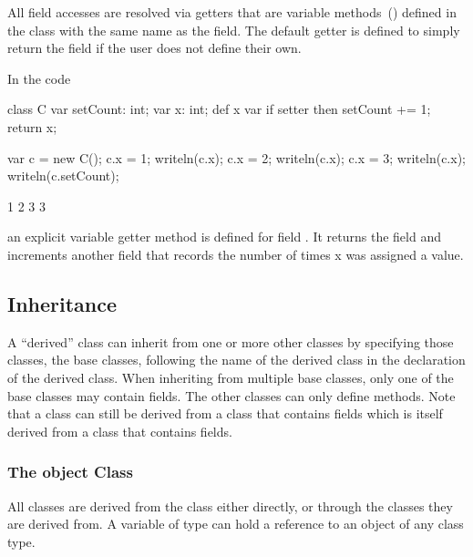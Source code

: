 All field accesses are resolved via getters that are variable
methods~() defined in the class with the same
name as the field.  The default getter is defined to simply return the
field if the user does not define their own.

\begin{example}
In the code
\begin{chapelpre}
\end{chapelpre}
\begin{chapel}
class C {
  var setCount: int;
  var x: int;
  def x var {
    if setter then
      setCount += 1;
    return x;
  }
}
\end{chapel}
\begin{chapelpost}
var c = new C();
c.x = 1;
writeln(c.x);
c.x = 2;
writeln(c.x);
c.x = 3;
writeln(c.x);
writeln(c.setCount);
\end{chapelpost}
\begin{chapeloutput}
1
2
3
3
\end{chapeloutput}
an explicit variable getter method is defined for field .  It
returns the field  and increments another field that records
the number of times x was assigned a value.
\end{example}

\subsection{Inheritance}
\label{Inheritance}

A ``derived'' class can inherit from one or more other classes by
specifying those classes, the base classes, following the name of the
derived class in the declaration of the derived class.  When
inheriting from multiple base classes, only one of the base classes
may contain fields.  The other classes can only define methods.  Note
that a class can still be derived from a class that contains fields
which is itself derived from a class that contains fields.
\subsubsection{The object Class}
\label{The_object_Class}

All classes are derived from the  class either directly, or
through the classes they are derived from. A variable of type 
can hold a reference to an object of any class type. 

